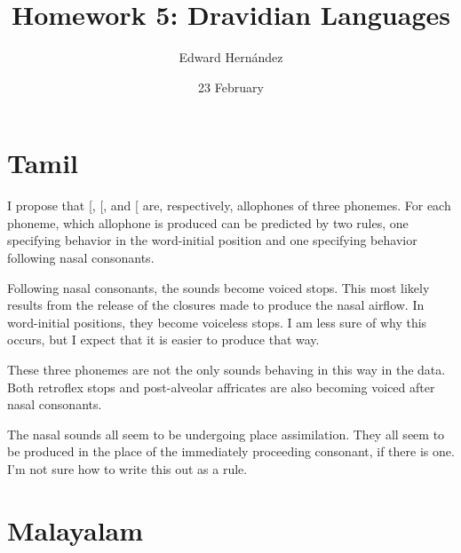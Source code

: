\documentclass[doc,12pt]{apa6}
\begin{document}
\title{Homework 5: Dravidian Languages}
\author{Edward Hern\'{a}ndez}
\date{23 February}
\maketitle

\section{Tamil}

I propose that {[}\textipa{p b B}{]}, {[}\textipa{t d D}{]}, and {[}\textipa{k
g G}{]} are, respectively, allophones of three phonemes.  For each phoneme,
which allophone is produced can be predicted by two rules, one specifying
behavior in the word-initial position and one specifying behavior following
nasal consonants.
\begin{exe}
	\ex {}
	\ex {}
	\ex {}
	\ex {}
	\ex {}
	\ex {}
\end{exe}
Following nasal consonants, the sounds become voiced stops. This most likely
results from the release of the closures made to produce the nasal airflow.
In word-initial positions, they become voiceless stops. I am less sure of
why this occurs, but I expect that it is easier to produce that way.

These three phonemes are not the only sounds behaving in this way in the data.
Both retroflex stops and post-alveolar affricates are also becoming voiced
after nasal consonants.
\begin{exe}
	\ex {}
	\ex {}
\end{exe}

The nasal sounds all seem to be undergoing place assimilation. They all seem to
be produced in the place of the immediately proceeding consonant, if there is
one. I'm not sure how to write this out as a rule.

\section{Malayalam}
\end{document}
